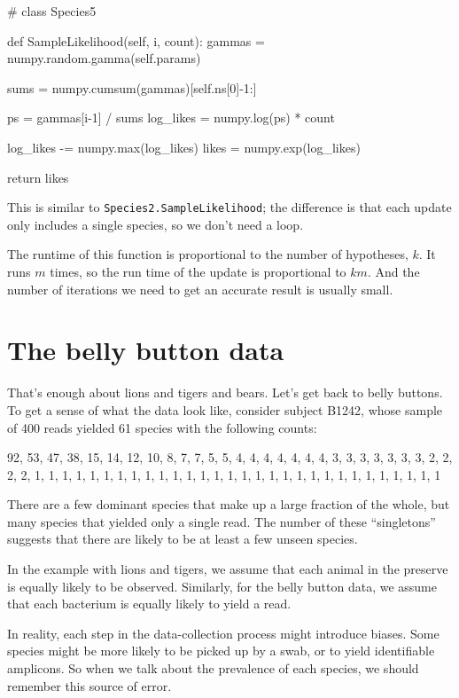 \documentclass[12pt]{book}
\theoremstyle{exercise}
\newcommand{\py}[1]{{\tt #1}}%
\begin{document}
\begin{code}
# class Species5

    def SampleLikelihood(self, i, count):
        gammas = numpy.random.gamma(self.params)

        sums = numpy.cumsum(gammas)[self.ns[0]-1:]

        ps = gammas[i-1] / sums
        log_likes = numpy.log(ps) * count

        log_likes -= numpy.max(log_likes)
        likes = numpy.exp(log_likes)

        return likes
\end{code}

This is similar to \py{Species2.SampleLikelihood}; the
difference is that each update only includes a single species,
so we don't need a loop.

The runtime of this function is proportional to the number
of hypotheses, $k$.  It runs $m$ times, so the run time of
the update is proportional to $k m$.
And the number of iterations we
need to get an accurate result is usually small.


\section{The belly button data}
\label{belly}

That's enough about lions and tigers and bears.
Let's get back to belly buttons.  To get a sense of what the
data look like, consider subject B1242,
whose sample of 400 reads yielded 61 species with the following
counts:

\begin{code}
92, 53, 47, 38, 15, 14, 12, 10, 8, 7, 7, 5, 5,
4, 4, 4, 4, 4, 4, 4, 3, 3, 3, 3, 3, 3, 3, 2, 2, 2, 2,
1, 1, 1, 1, 1, 1, 1, 1, 1, 1, 1, 1, 1, 1, 1, 1, 1, 1,
1, 1, 1, 1, 1, 1, 1, 1, 1, 1, 1, 1
\end{code}

There are a few dominant species that make up a large
fraction of the whole, but many species that yielded only
a single read.  The number of these ``singletons'' suggests
that there are likely to be at least a few unseen species.

In the example with lions and tigers, we assume that each
animal in the preserve is equally likely to be observed.
Similarly, for the belly button data, we assume that each
bacterium is equally likely to yield a read.

In reality, each step in the data-collection
process might introduce biases.  Some species might
be more likely to be picked up by a swab, or to yield identifiable
amplicons.  So when we talk about the prevalence of each species,
we should remember this source of error.
\end{document}
